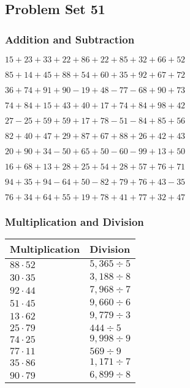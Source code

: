 \hypertarget{problem-set-51}{%
\subsection{Problem Set 51}\label{problem-set-51}}

\hypertarget{addition-and-subtraction}{%
\subsubsection{Addition and
Subtraction}\label{addition-and-subtraction}}

\(15+23+33+22+86+22+85+32+66+52\)

\(85+14+45+88+54+60+35+92+67+72\)

\(36+74+91+90-19+48-77-68+90+73\)

\(74+84+15+43+40+17+74+84+98+42\)

\(27-25+59+59+17+78-51-84+85+56\)

\(82+40+47+29+87+67+88+26+42+43\)

\(20+90+34-50+65+50-60-99+13+50\)

\(16+68+13+28+25+54+28+57+76+71\)

\(94+35+94-64+50-82+79+76+43-35\)

\(76+34+64+55+19+78+41+77+32+47\)

\hypertarget{multiplication-and-division}{%
\subsubsection{Multiplication and
Division}\label{multiplication-and-division}}

\begin{longtable}[]{@{}ll@{}}
\toprule
Multiplication & Division\tabularnewline
\midrule
\endhead
\(88\cdot52\) & \(5,365÷5\)\tabularnewline
\(30\cdot35\) & \(3,188÷8\)\tabularnewline
\(92\cdot44\) & \(7,968÷7\)\tabularnewline
\(51\cdot45\) & \(9,660÷6\)\tabularnewline
\(13\cdot62\) & \(9,779÷3\)\tabularnewline
\(25\cdot79\) & \(444÷5\)\tabularnewline
\(74\cdot25\) & \(9,998÷9\)\tabularnewline
\(77\cdot11\) & \(569÷9\)\tabularnewline
\(35\cdot86\) & \(1,171÷7\)\tabularnewline
\(90\cdot79\) & \(6,899÷8\)\tabularnewline
\bottomrule
\end{longtable}
